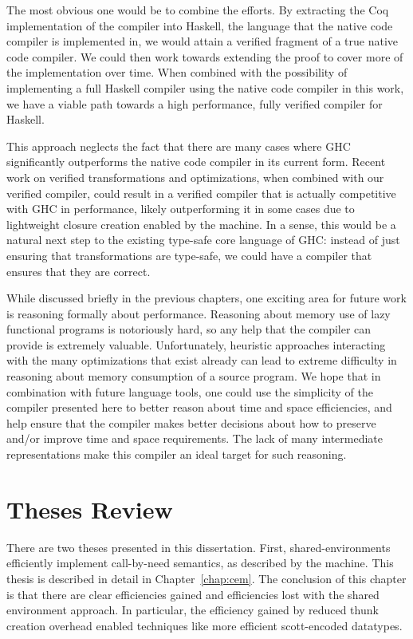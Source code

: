 The most obvious one would be to combine the efforts. By extracting the Coq
implementation of the compiler into Haskell, the language that the native code
compiler is implemented in, we would attain a verified fragment of a true native
code compiler. We could then work towards extending the proof to cover more of
the implementation over time. When combined with the possibility of implementing
a full Haskell compiler using the native code compiler in this work, we have a
viable path towards a high performance, fully verified compiler for Haskell. 

This approach neglects the fact that there are many cases where GHC
significantly outperforms the native code compiler in its current form. Recent
work on verified transformations and optimizations, when combined with our
verified compiler, could result in a verified compiler that is actually
competitive with GHC in performance, likely outperforming it in some cases due
to lightweight closure creation enabled by the \ce machine. In a sense, this
would be a natural next step to the existing type-safe core language of GHC:
instead of just ensuring that transformations are type-safe, we could have a
compiler that ensures that they are correct.

While discussed briefly in the previous chapters, one exciting area for future
work is reasoning formally about performance. Reasoning about memory use of lazy
functional programs is notoriously hard, so any help that the compiler can
provide is extremely valuable. Unfortunately, heuristic approaches interacting
with the many optimizations that exist already can lead to extreme difficulty in
reasoning about memory consumption of a source program. We hope that in
combination with future language tools, one could use the simplicity of the
compiler presented here to better reason about time and space efficiencies, and
help ensure that the compiler makes better decisions about how to preserve
and/or improve time and space requirements. The lack of many intermediate
representations make this compiler an ideal target for such reasoning.

\section{Theses Review}

There are two theses presented in this dissertation. First, shared-environments
efficiently implement call-by-need semantics, as described by the \ce machine.
This thesis is described in detail in Chapter~\ref{chap:cem}. The conclusion of
this chapter is that there are clear efficiencies gained and efficiencies lost
with the shared environment approach.  In particular, the efficiency gained by
reduced thunk creation overhead enabled techniques like more efficient
scott-encoded datatypes. 

